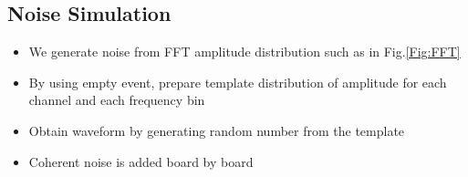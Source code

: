 


%
\subsection{Noise Simulation}

\begin{itemize}
\item We generate noise from FFT amplitude distribution such as in Fig.\ref{Fig:FFT}
\item By using empty event, prepare template distribution of amplitude for each channel and each frequency bin
\item Obtain waveform by generating random number from the template
\item Coherent noise is added board by board
\end{itemize}

